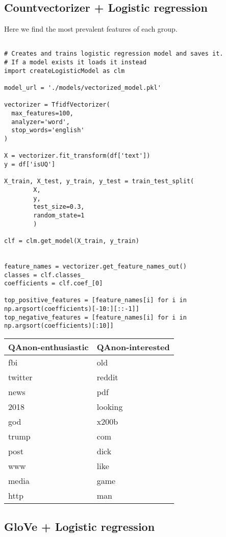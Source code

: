 \documentclass{article}
\begin{document}
\subsection{Countvectorizer + Logistic regression}
Here we find the most prevalent features of each group.
\begin{verbatim}

# Creates and trains logistic regression model and saves it.
# If a model exists it loads it instead
import createLogisticModel as clm

model_url = './models/vectorized_model.pkl'

vectorizer = TfidfVectorizer(
  max_features=100,
  analyzer='word',
  stop_words='english'
)

X = vectorizer.fit_transform(df['text'])
y = df['isUQ']

X_train, X_test, y_train, y_test = train_test_split(
        X, 
        y,
        test_size=0.3,
        random_state=1
        )

clf = clm.get_model(X_train, y_train)


feature_names = vectorizer.get_feature_names_out()
classes = clf.classes_
coefficients = clf.coef_[0]

top_positive_features = [feature_names[i] for i in np.argsort(coefficients)[-10:][::-1]]
top_negative_features = [feature_names[i] for i in np.argsort(coefficients)[:10]]
\end{verbatim}

\begin{center}
  \begin{tabular}[H]{|l|l|}
    \hline
    QAnon-enthusiastic&QAnon-interested\\
    \hline
    fbi&old\\
    twitter&reddit\\
    news&pdf\\
    2018&looking\\
    god&x200b\\
    trump&com\\
    post&dick\\
    www&like\\
    media&game\\
    http&man\\
   \hline
  \end{tabular}
\end{center}

\subsection*{GloVe + Logistic regression}
\end{document}
